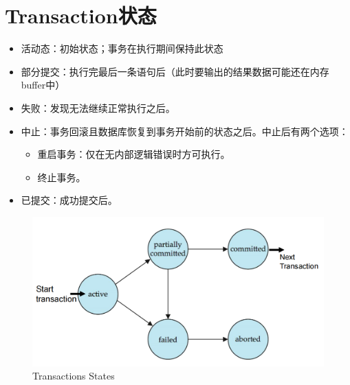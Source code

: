 \section{Transaction状态}
\begin{itemize}
    \item 活动态：初始状态；事务在执行期间保持此状态
    \item 部分提交：执行完最后一条语句后（此时要输出的结果数据可能还在内存buffer中）
    \item 失败：发现无法继续正常执行之后。
    \item 中止：事务回滚且数据库恢复到事务开始前的状态之后。中止后有两个选项：
       \begin{itemize}
          \item 重启事务：仅在无内部逻辑错误时方可执行。
          \item 终止事务。
       \end{itemize}
    \item 已提交：成功提交后。
\end{itemize}

\begin{figure}[H]
    \centering
    \includegraphics[width=0.8\linewidth]{image1.png}
    \caption{Transactions States}
    \label{}
\end{figure}